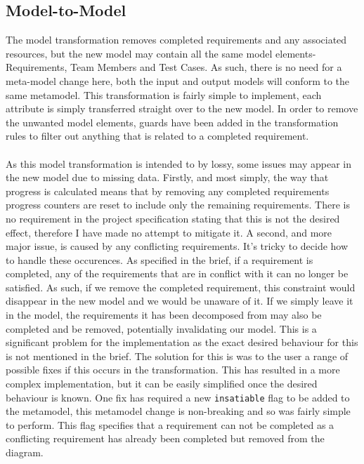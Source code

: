 \documentclass{article}
\begin{document}
\subsection{Model-to-Model}
\label{model-to-model}
The model transformation removes completed requirements and any associated resources, but the new model may contain all the same model elements- Requirements, Team Members and Test Cases. As such, there is no need for a meta-model change here, both the input and output models will conform to the same metamodel. This transformation is fairly simple to implement, each attribute is simply transferred straight over to the new model. In order to remove the unwanted model elements, guards have been added in the transformation rules to filter out anything that is related to a completed requirement.
\\\\
As this model transformation is intended to by lossy, some issues may appear in the new model due to missing data. Firstly, and most simply, the way that progress is calculated means that by removing any completed requirements progress counters are reset to include only the remaining requirements. There is no requirement in the project specification stating that this is not the desired effect, therefore I have made no attempt to mitigate it. A second, and more major issue, is caused by any conflicting requirements. It's tricky to decide how to handle these occurences. As specified in the brief, if a requirement is completed, any of the requirements that are in conflict with it can no longer be satisfied. As such, if we remove the completed requirement, this constraint would disappear in the new model and we would be unaware of it. If we simply leave it in the model, the requirements it has been decomposed from may also be completed and be removed, potentially invalidating our model. This is a significant problem for the implementation as the exact desired behaviour for this is not mentioned in the brief. The solution for this is was to the user a range of possible fixes if this occurs in the transformation. This has resulted in a more complex implementation, but it can be easily simplified once the desired behaviour is known. One fix has required a new \texttt{insatiable} flag to be added to the metamodel, this metamodel change is non-breaking and so was fairly simple to perform. This flag specifies that a requirement can not be completed as a conflicting requirement has already been completed but removed from the diagram.
\end{document}
